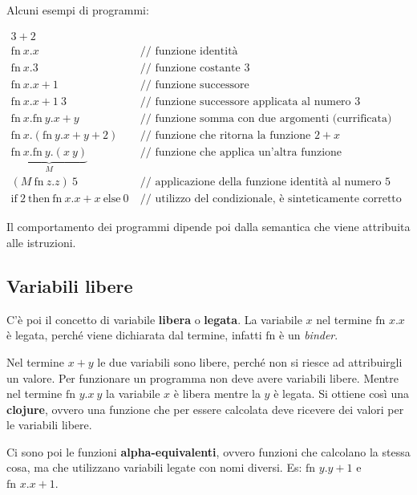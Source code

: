 Alcuni esempi di programmi:

\begin{align*}
3 + 2 &\\
\text{fn} \:  x.x &\:\text{// funzione identità} \\
\text{fn} \: x.3 &\: \text{// funzione costante 3} \\
\text{fn} \: x.x+1 &\: \text{// funzione successore} \\
\text{fn} \: x.x+1 \: 3 &\: \text{// funzione successore applicata al numero 3} \\
\text{fn} \: x.\text{fn} \: y . x+y &\: \text{// funzione somma con due argomenti (currificata)} \\
\text{fn} \: x. (\text{fn} \: y . x+y   + 2) &\: \text{// funzione che ritorna la funzione $2+x$} \\
\underbrace{\text{fn} \: x.\text{fn}\ y.(x\: y)}_{M} &\: \text{// funzione che applica un'altra funzione} \\
(M \: \text{fn} \: z.z) \: 5 &\: \text{// applicazione della funzione identità al numero 5} \\
\text{if} \: 2 \: \text{then} \: \text{fn}\: x.x+x \: \text{else} \: 0 &\: \text{// utilizzo del condizionale, è sinteticamente corretto ma non a livello di tipi}
\end{align*}

\noindent Il comportamento dei programmi dipende poi dalla semantica che viene attribuita alle istruzioni.

\subsection{Variabili libere}

C'è poi il concetto di variabile \textbf{libera} o \textbf{legata}.
La variabile $x$ nel termine $\text{fn } x.x$ è legata, perché viene dichiarata dal termine, infatti $\text{fn}$ è un \textit{binder}.

Nel termine $x+y$ le due variabili sono libere, perché non si riesce ad attribuirgli un valore. Per funzionare un programma non deve avere variabili libere.
Mentre nel termine $\text{fn }y. x\: y$ la variabile $x$ è libera mentre la $y$ è legata. Si ottiene così una \textbf{clojure}, ovvero una funzione che per essere calcolata deve ricevere dei valori per le variabili libere.

Ci sono poi le funzioni \textbf{alpha-equivalenti}, ovvero funzioni che calcolano la stessa cosa, ma che utilizzano variabili legate con nomi diversi. Es: $\text{fn }y.y+1$ e $\text{fn }x.x+1$.

